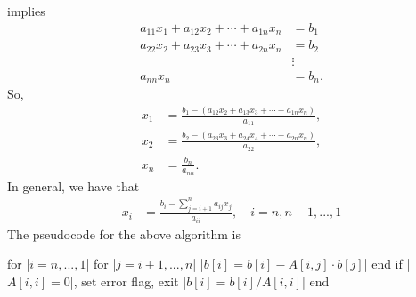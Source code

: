 \documentclass{report}
\begin{document}
            implies
            \begin{align*}
                a_{11}x_{1} + a_{12}x_{2} + \cdots + a_{1n}x_{n} &= b_{1} \\
                a_{22}x_{2} + a_{23}x_{3} + \cdots + a_{2n}x_{n} &= b_{2} \\
                                                                 &\vdots \\
                a_{nn} x_{n} &= b_{n}
            .\end{align*}
            So, 
            \begin{align*}
                x_{1} &= \frac{b_{1} - (a_{12}x_{2} + a_{13}x_{3} + \cdots + a_{1n}x_{n})}{a_{11}} ,\\
                x_{2} &= \frac{b_{2} - (a_{23}x_{3} + a_{24}x_{4} + \cdots + a_{2n}x_{n})}{a_{22}} ,\\
                x_{n} &= \frac{b_{n}}{a_{nn}}
            .\end{align*}
            In general, we have that
            \begin{align*}
                x_{i} &= \frac{b_{i} - \sum_{j=i+1}^{n}a_{ij}x_{j}}{a_{ii}}, \quad i=n,n-1,...,1
            \end{align*}
            The pseudocode for the above algorithm is
            \bigbreak \noindent 
            \begin{jlcode}
                for |$i=n,...,1$|
                    for |$j=i+1,...,n$|
                        |$b[i] = b[i] - A[i,j] \cdot b[j]$|
                    end
                    if |$A[i,i] = 0$|, set error flag, exit
                    |$b[i] = b[i] / A[i,i]$|
                end
            \end{jlcode}
\end{document}

